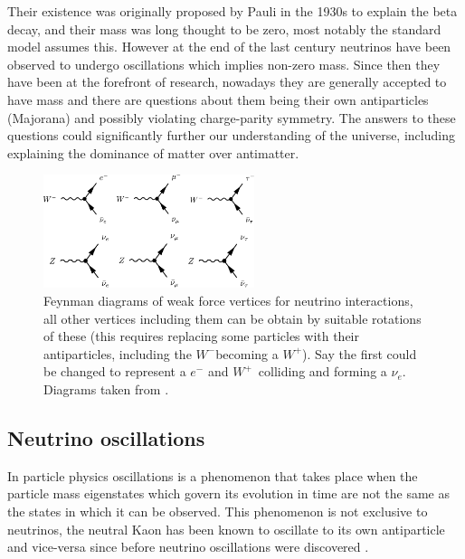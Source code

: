 \documentclass[a4paper,12pt]{article}
\newcommand{\Ne}{$\nu_e$}
\newcommand{\Wp}{$W^+$}
\newcommand{\Wm}{$W^-$}
\begin{document}
Their existence was originally proposed by Pauli in the 1930s to explain the beta decay, and their mass was long thought to be zero, most notably the standard model assumes this.
However at the end of the last century neutrinos have been observed to undergo oscillations which implies non-zero mass.
Since then they have been at the forefront of research, nowadays they are generally accepted to have mass and there are questions about them being their own antiparticles (Majorana) and possibly violating charge-parity symmetry.
The answers to these questions could significantly further our understanding of the universe, including explaining the dominance of matter over antimatter.

\begin{figure}[H]
    \centering
    \includegraphics[width=0.55\textwidth]{figures/NeutrinoFeynman.pdf}
    \caption{
        Feynman diagrams of weak force vertices for neutrino interactions, all other vertices including them can be obtain by suitable rotations of these
        (this requires replacing some particles with their antiparticles, including the \Wm becoming a \Wp).
        Say the first could be changed to represent a $e^-$ and \Wp\ colliding and forming a \Ne.
        Diagrams taken from \cite{potterFeynmanDiagramsParticlea}.
    }\label{fig:nu_feyn}
\end{figure}

\subsection{Neutrino oscillations}
In particle physics oscillations is a phenomenon that takes place when the particle mass eigenstates which govern its evolution in time are not the same as the states in which it can be observed.
This phenomenon is not exclusive to neutrinos, the neutral Kaon has been known to oscillate to its own antiparticle and vice-versa since before neutrino oscillations were discovered \cite{burkhardtWavelengthNeutrinoNeutral2003}.
\end{document}
